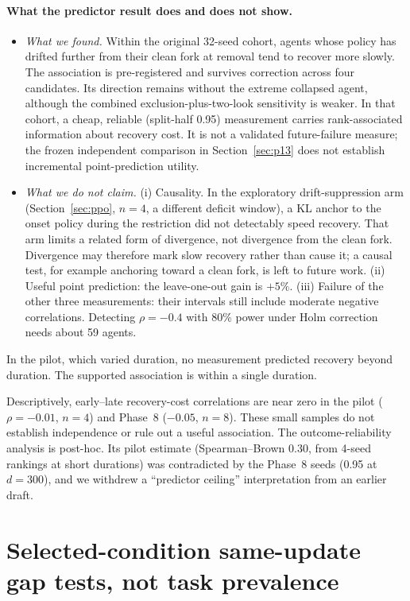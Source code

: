 \documentclass[10pt]{article} %
\begin{document}
\paragraph{What the predictor result does and does not show.}
\begin{itemize}
\item \emph{What we found.} Within the original 32-seed cohort, agents whose policy has drifted further from their clean fork at removal tend to recover more slowly. The association is pre-registered and survives correction across four candidates. Its direction remains without the extreme collapsed agent, although the combined exclusion-plus-two-look sensitivity is weaker. In that cohort, a cheap, reliable (split-half 0.95) measurement carries rank-associated information about recovery cost. It is not a validated future-failure measure; the frozen independent comparison in Section~\ref{sec:p13} does not establish incremental point-prediction utility.
\item \emph{What we do not claim.} (i) Causality. In the exploratory drift-suppression arm (Section~\ref{sec:ppo}, $n=4$, a different deficit window), a KL anchor to the onset policy during the restriction did not detectably speed recovery. That arm limits a related form of divergence, not divergence from the clean fork. Divergence may therefore mark slow recovery rather than cause it; a causal test, for example anchoring toward a clean fork, is left to future work. (ii) Useful point prediction: the leave-one-out gain is $+5\%$. (iii) Failure of the other three measurements: their intervals still include moderate negative correlations. Detecting $\rho=-0.4$ with 80\% power under Holm correction needs about 59 agents.
\end{itemize}
In the pilot, which varied duration, no measurement predicted recovery beyond duration. The supported association is within a single duration.

Descriptively, early--late recovery-cost correlations are near zero in the pilot ($\rho=-0.01$, $n=4$) and Phase~8 ($-0.05$, $n=8$). These small samples do not establish independence or rule out a useful association. The outcome-reliability analysis is post-hoc. Its pilot estimate (Spearman--Brown 0.30, from 4-seed rankings at short durations) was contradicted by the Phase~8 seeds (0.95 at $d=300$), and we withdrew a ``predictor ceiling'' interpretation from an earlier draft.

\section{Selected-condition same-update gap tests, not task prevalence}\label{sec:general}
\end{document}
